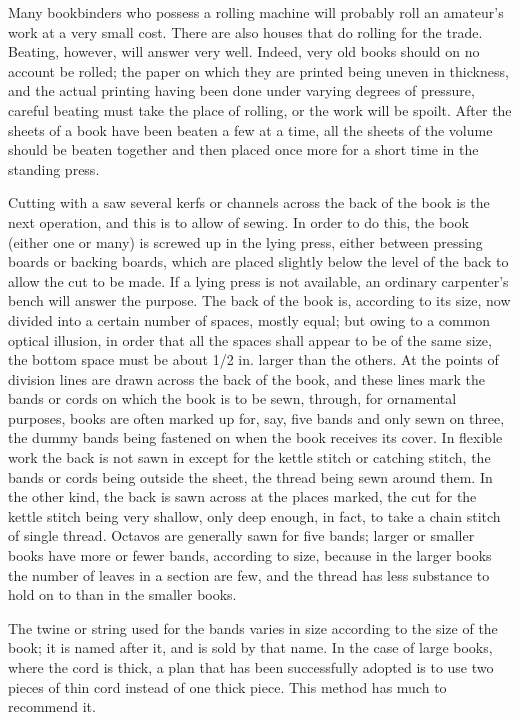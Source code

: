 \documentclass[twoside]{book}
\begin{document}
Many bookbinders who possess a rolling machine
will probably roll an amateur's work at a very small
cost. There are also houses that do rolling for the
trade. Beating, however, will answer very well.
Indeed, very old books should on no account be
rolled; the paper on which they are printed being
uneven in thickness, and the actual printing having
been done under varying degrees of pressure, careful
beating must take the place of rolling, or the
work will be spoilt. After the sheets of a book
have been beaten a few at a time, all the sheets of
the volume should be beaten together and then
placed once more for a short time in the standing
press.

Cutting with a saw several kerfs or channels
across the back of the book is the next operation,
and this is to allow of sewing. In order to do this,
the book (either one or many) is screwed up in the
lying press, either between pressing boards or backing
boards, which are placed slightly below the
\pagebreak
level of the back to allow the cut to be made. If a
lying press is not available, an ordinary carpenter's
bench will answer the purpose. The back of the
book is, according to its size, now divided into a
certain number of spaces, mostly equal; but owing
to a common optical illusion, in order that all the
spaces shall appear to be of the same size, the
bottom space must be about 1/2 in. larger than the
others. At the points of division lines are drawn
across the back of the book, and these lines mark
the bands or cords on which the book is to be sewn,
through, for ornamental purposes, books are often
marked up for, say, five bands and only sewn on
three, the dummy bands being fastened on when the
book receives its cover. In flexible work the back
is not sawn in except for the kettle stitch or catching
stitch, the bands or cords being outside the sheet,
the thread being sewn around them. In the other
kind, the back is sawn across at the places marked,
the cut for the kettle stitch being very shallow,
only deep enough, in fact, to take a chain stitch of
single thread. Octavos are generally sawn for five
bands; larger or smaller books have more or fewer
bands, according to size, because in the larger
books the number of leaves in a section are few,
and the thread has less substance to hold on to
than in the smaller books.

The twine or string used for the bands varies
in size according to the size of the book; it is
named after it, and is sold by that name. In the
case of large books, where the cord is thick, a plan
that has been successfully adopted is to use two
pieces of thin cord instead of one thick piece. This
method has much to recommend it.
\end{document}
